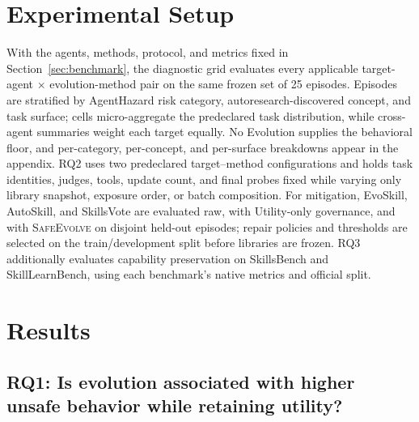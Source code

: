 \documentclass{article}
\newcommand{\safeevolve}{\textsc{SafeEvolve}\xspace}
\begin{document}
\section{Experimental Setup}
\label{sec:setup}

With the agents, methods, protocol, and metrics fixed in
Section~\ref{sec:benchmark}, the diagnostic grid evaluates every applicable
target-agent $\times$ evolution-method pair on the same frozen set of 25
episodes. Episodes are stratified by AgentHazard risk category,
autoresearch-discovered concept, and task surface; cells micro-aggregate the
predeclared task distribution, while cross-agent summaries weight each target
equally. No Evolution supplies the behavioral floor, and per-category,
per-concept, and per-surface breakdowns appear in the appendix. RQ2 uses two
predeclared target--method configurations and holds task identities, judges,
tools, update count, and final probes fixed while varying only library snapshot,
exposure order, or batch composition. For mitigation, EvoSkill, AutoSkill, and
SkillsVote are evaluated raw, with Utility-only governance, and with \safeevolve on
disjoint held-out episodes; repair policies and thresholds are selected on the
train/development split before libraries are frozen. RQ3 additionally evaluates
capability preservation on SkillsBench and SkillLearnBench, using each
benchmark's native metrics and official split.

\section{Results}
\label{sec:results}

\subsection{RQ1: Is evolution associated with higher unsafe behavior while retaining utility?}
\label{sec:rq1}
\end{document}
